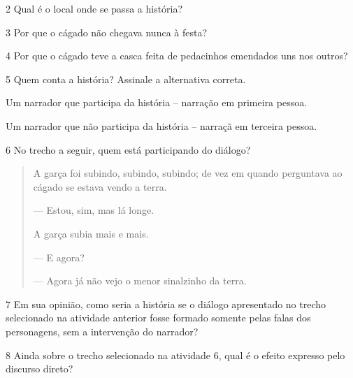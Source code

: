 
\num{2} Qual é o local onde se passa a história?


\num{3} Por que o cágado não chegava nunca à festa?


\num{4} Por que o cágado teve a casca feita de pedacinhos emendados uns nos
outros?


\num{5} Quem conta a história? Assinale a alternativa correta.

\begin{boxlist}
\boxitem[] Um narrador que participa da história -- narração em primeira pessoa.

\boxitem[X] Um narrador que não participa da história -- narraçã em terceira pessoa.
\end{boxlist}

\num{6} No trecho a seguir, quem está participando do diálogo?

\begin{quote}
A garça foi subindo, subindo, subindo; de vez em quando perguntava ao
cágado se estava vendo a terra.

--- Estou, sim, mas lá longe.

A garça subia mais e mais.

--- E agora?

--- Agora já não vejo o menor sinalzinho da terra.
\end{quote}


\num{7} Em sua opinião, como seria a história se o diálogo apresentado no trecho selecionado na atividade anterior fosse formado
somente pelas falas dos personagens, sem a intervenção do narrador?




\num{8} Ainda sobre o trecho selecionado na atividade 6, qual é o efeito expresso pelo discurso direto?


